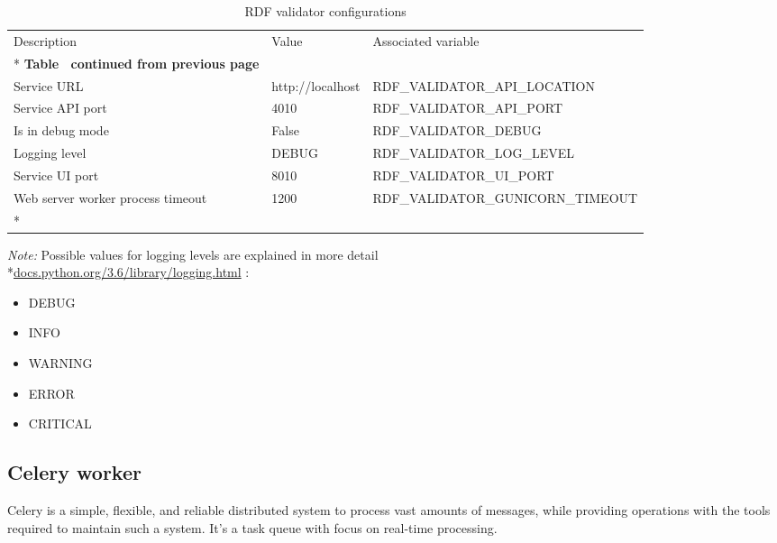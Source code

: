 \begin{longtable}[c]{@{}p{3.5cm}p{3.5cm}l@{}}
	\toprule
	Description                       & Value            & Associated variable               \\* \midrule
	\endfirsthead
	\multicolumn{3}{c}%
	{{\bfseries Table \thetable\ continued from previous page}}                              \\
	\endhead
	\bottomrule
	\endfoot
	\endlastfoot
	Service URL                       & http://localhost & RDF\_VALIDATOR\_API\_LOCATION     \\
	Service API port                  & 4010             & RDF\_VALIDATOR\_API\_PORT         \\
	Is in debug mode                  & False            & RDF\_VALIDATOR\_DEBUG             \\
	Logging level                     & DEBUG            & RDF\_VALIDATOR\_LOG\_LEVEL        \\
	Service UI port                   & 8010             & RDF\_VALIDATOR\_UI\_PORT          \\
	Web server worker process timeout & 1200             & RDF\_VALIDATOR\_GUNICORN\_TIMEOUT \\* \bottomrule
	\caption{RDF validator configurations}
	\label{tab:rdf-validator-configuration}                                                  \\
\end{longtable}

\textit{Note:} Possible values for logging levels are explained in more detail \\*\href{https://docs.python.org/3.6/library/logging.html#logging-levels}{docs.python.org/3.6/library/logging.html} :
\begin{itemize}
	\item DEBUG
	\item INFO
	\item WARNING
	\item ERROR
	\item CRITICAL
\end{itemize}

\subsection{Celery worker}
Celery is a simple, flexible, and reliable distributed system to process vast amounts of messages, while providing operations with the tools required to maintain such a system. It’s a task queue with focus on real-time processing.

